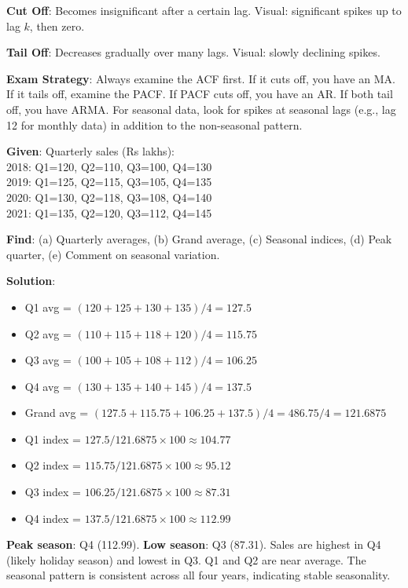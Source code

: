 \documentclass[11pt,a4paper]{article}
\begin{document}
\textbf{Cut Off}: Becomes insignificant after a certain lag. Visual: significant spikes up to lag $k$, then zero.

\textbf{Tail Off}: Decreases gradually over many lags. Visual: slowly declining spikes.

\textbf{Exam Strategy}: Always examine the ACF first. If it cuts off, you have an MA. If it tails off, examine the PACF. If PACF cuts off, you have an AR. If both tail off, you have ARMA. For seasonal data, look for spikes at seasonal lags (e.g., lag 12 for monthly data) in addition to the non-seasonal pattern.

\begin{tcolorbox}[colback=green!5!white,colframe=green!75!black,title=\textbf{Worked Example 20: Seasonal Indices Calculation}]
\textbf{Given}: Quarterly sales (Rs lakhs):\\
2018: Q1=120, Q2=110, Q3=100, Q4=130\\
2019: Q1=125, Q2=115, Q3=105, Q4=135\\
2020: Q1=130, Q2=118, Q3=108, Q4=140\\
2021: Q1=135, Q2=120, Q3=112, Q4=145

\textbf{Find}: (a) Quarterly averages, (b) Grand average, (c) Seasonal indices, (d) Peak quarter, (e) Comment on seasonal variation.

\textbf{Solution}:
\begin{itemize}
    \item Q1 avg = $(120+125+130+135)/4 = 127.5$
    \item Q2 avg = $(110+115+118+120)/4 = 115.75$
    \item Q3 avg = $(100+105+108+112)/4 = 106.25$
    \item Q4 avg = $(130+135+140+145)/4 = 137.5$
    \item Grand avg = $(127.5+115.75+106.25+137.5)/4 = 486.75/4 = 121.6875$
    \item Q1 index = $127.5/121.6875 \times 100 \approx 104.77$
    \item Q2 index = $115.75/121.6875 \times 100 \approx 95.12$
    \item Q3 index = $106.25/121.6875 \times 100 \approx 87.31$
    \item Q4 index = $137.5/121.6875 \times 100 \approx 112.99$
\end{itemize}
\textbf{Peak season}: Q4 (112.99). \textbf{Low season}: Q3 (87.31). Sales are highest in Q4 (likely holiday season) and lowest in Q3. Q1 and Q2 are near average. The seasonal pattern is consistent across all four years, indicating stable seasonality.
\end{tcolorbox}
\end{document}
